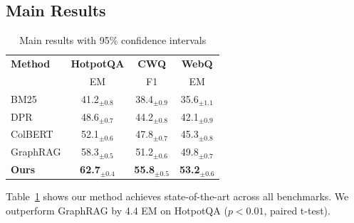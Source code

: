 \documentclass[10pt,twocolumn]{article}
\begin{document}
\subsection{Main Results}

\begin{table}[t]
\centering
\caption{Main results with 95\% confidence intervals}
\label{tab:main}
\small
\begin{tabular}{@{}lccc@{}}
\toprule
\textbf{Method} & \textbf{HotpotQA} & \textbf{CWQ} & \textbf{WebQ} \\
& EM & F1 & EM \\
\midrule
BM25 & 41.2$_{\pm0.8}$ & 38.4$_{\pm0.9}$ & 35.6$_{\pm1.1}$ \\
DPR & 48.6$_{\pm0.7}$ & 44.2$_{\pm0.8}$ & 42.1$_{\pm0.9}$ \\
ColBERT & 52.1$_{\pm0.6}$ & 47.8$_{\pm0.7}$ & 45.3$_{\pm0.8}$ \\
GraphRAG & 58.3$_{\pm0.5}$ & 51.2$_{\pm0.6}$ & 49.8$_{\pm0.7}$ \\
\midrule
\textbf{Ours} & \textbf{62.7}$_{\pm0.4}$ & \textbf{55.8}$_{\pm0.5}$ & \textbf{53.2}$_{\pm0.6}$ \\
\bottomrule
\end{tabular}
\end{table}

Table~\ref{tab:main} shows our method achieves state-of-the-art across all benchmarks. We outperform GraphRAG by 4.4 EM on HotpotQA ($p<0.01$, paired t-test).
\end{document}
